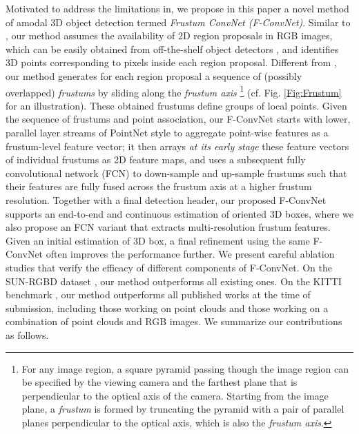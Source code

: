 \documentclass[letterpaper, 10 pt, conference]{ieeeconf}
\begin{document}
Motivated to address the limitations in\cite{qi2018frustum, zhou2018voxelnet}, we propose in this paper a novel method of amodal 3D object detection termed \emph{Frustum ConvNet (F-ConvNet)}. Similar to \cite{qi2018frustum}, our method assumes the availability of 2D region proposals in RGB images, which can be easily obtained from off-the-shelf object detectors \cite{girshick2015fast, ren2015faster, liu2016ssd}, and identifies 3D points corresponding to pixels inside each region proposal. Different from \cite{qi2018frustum}, our method generates for each region proposal a sequence of (possibly overlapped) \emph{frustums} by sliding along the \emph{frustum axis} \footnote{For any image region, a square pyramid passing though the image region can be specified by the viewing camera and the farthest plane that is perpendicular to the optical axis of the camera. Starting from the image plane, a \emph{frustum} is formed by truncating the pyramid with a pair of parallel planes perpendicular to the optical axis, which is also the \emph{frustum axis}.} (cf. Fig. \ref{Fig:Frustum} for an illustration). These obtained frustums define groups of local points. Given the sequence of frustums and point association, our F-ConvNet starts with lower, parallel layer streams of PointNet style to aggregate point-wise features as a frustum-level feature vector; it then arrays \emph{at its early stage} these feature vectors of individual frustums  as 2D feature maps, and uses a subsequent fully convolutional network (FCN) to down-sample and up-sample frustums such that their features are fully fused across the frustum axis at a higher frustum resolution. Together with a final detection header, our proposed F-ConvNet supports an end-to-end and continuous estimation of oriented 3D boxes, where we also propose an FCN variant that extracts multi-resolution frustum features. Given an initial estimation of 3D box, a final refinement using the same F-ConvNet often improves the performance further. We present careful ablation studies that verify the efficacy of different components of F-ConvNet. On the SUN-RGBD dataset \cite{song2015sun}, our method outperforms all existing ones. On the KITTI benchmark \cite{geiger2012we}, our method outperforms all published works at the time of submission, including those working on point clouds and those working on a combination of point clouds and RGB images. We summarize our contributions as follows.
\end{document}
